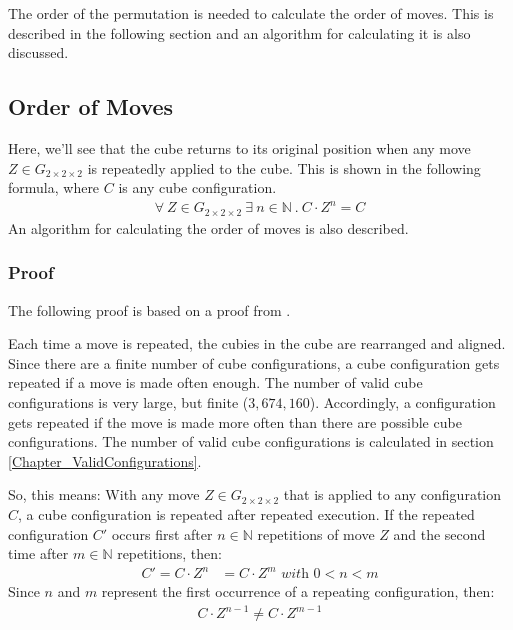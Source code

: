 \documentclass[12pt,a4paper]{article}
\theoremstyle{custom}
\newcommand{\Gtwo}{\ensuremath{G_{2\times 2\times 2}}}
\begin{document}
The order of the permutation is needed to calculate the order of moves. This is described in the following section and an algorithm for calculating it is also discussed.
\subsection{Order of Moves}
\label{Section_Ordermoves}
Here, we'll see that the cube returns to its original position when any move $Z \in \Gtwo$ is repeatedly applied to the cube. This is shown in the following formula, where $C$ is any cube configuration.
\begin{align*}
\forall \ Z \in \Gtwo \ \exists \ n \in \mathbb{N} \ . \ C \cdot Z^n = C
\end{align*} \nopagebreak An algorithm for calculating the order of moves is also described.
\subsubsection*{Proof}

The following proof is based on a proof from \cite{TD}.

Each time a move is repeated, the cubies in the cube are rearranged and aligned.\\
Since there are a finite number of cube configurations, a cube configuration gets repeated if a move is made often enough.
The number of valid cube configurations is very large, but finite ($3 , 674 , 160$). Accordingly, a configuration gets repeated if the move is made more often than there are possible cube configurations. The number of valid cube configurations is calculated in section \ref{Chapter_ValidConfigurations}.

So, this means: With any move $Z \in \Gtwo$ that is applied to any configuration $C$, a cube configuration is repeated after repeated execution. If the repeated configuration $C'$ occurs first after $n \in \mathbb{N}$ repetitions of move $Z$ and the second time after $m \in \mathbb{N}$ repetitions, then:
\begin{align*}
C' = C \cdot Z^n& = C \cdot Z^m \textit{ with } 0<n<m
\end{align*}
Since $n$ and $m$ represent the first occurrence of a repeating configuration, then:
\begin{align*}
C \cdot Z^{n-1} \neq C \cdot Z^{m-1}
\end{align*}
\end{document}
